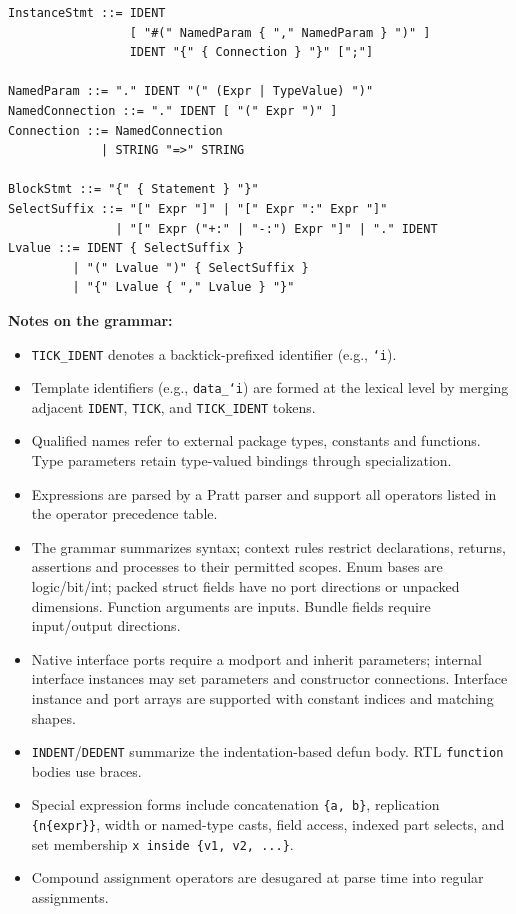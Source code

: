 \documentclass[lang=en,11pt]{elegantbook}
\newcommand{\code}[1]{\texttt{#1}}
\begin{document}
\begin{lstlisting}[basicstyle=\ttfamily\footnotesize,
  keywordstyle={},
  frame=single,
  backgroundcolor=\color{codebg},
  escapechar=@]
InstanceStmt ::= IDENT
                 [ "#(" NamedParam { "," NamedParam } ")" ]
                 IDENT "{" { Connection } "}" [";"]

NamedParam ::= "." IDENT "(" (Expr | TypeValue) ")"
NamedConnection ::= "." IDENT [ "(" Expr ")" ]
Connection ::= NamedConnection
             | STRING "=>" STRING

BlockStmt ::= "{" { Statement } "}"
SelectSuffix ::= "[" Expr "]" | "[" Expr ":" Expr "]"
               | "[" Expr ("+:" | "-:") Expr "]" | "." IDENT
Lvalue ::= IDENT { SelectSuffix }
         | "(" Lvalue ")" { SelectSuffix }
         | "{" Lvalue { "," Lvalue } "}"
\end{lstlisting}

\textbf{Notes on the grammar:}
\begin{itemize}
  \item \code{TICK\_IDENT} denotes a backtick-prefixed identifier (e.g., \code{`i}).
  \item Template identifiers (e.g., \code{data\_`i}) are formed at the lexical level by merging adjacent \code{IDENT}, \code{TICK}, and \code{TICK\_IDENT} tokens.
  \item Qualified names refer to external package types, constants and functions. Type parameters retain type-valued bindings through specialization.
  \item Expressions are parsed by a Pratt parser and support all operators listed in the operator precedence table.
  \item The grammar summarizes syntax; context rules restrict declarations, returns, assertions and processes to their permitted scopes. Enum bases are logic/bit/int; packed struct fields have no port directions or unpacked dimensions. Function arguments are inputs. Bundle fields require input/output directions.
  \item Native interface ports require a modport and inherit parameters; internal interface instances may set parameters and constructor connections. Interface instance and port arrays are supported with constant indices and matching shapes.
  \item \code{INDENT}/\code{DEDENT} summarize the indentation-based defun body. RTL \code{function} bodies use braces.
  \item Special expression forms include concatenation \code{\{a, b\}}, replication \code{\{n\{expr\}\}}, width or named-type casts, field access, indexed part selects, and set membership \code{x inside \{v1, v2, ...\}}.
  \item Compound assignment operators are desugared at parse time into regular assignments.
\end{itemize}
\end{document}
